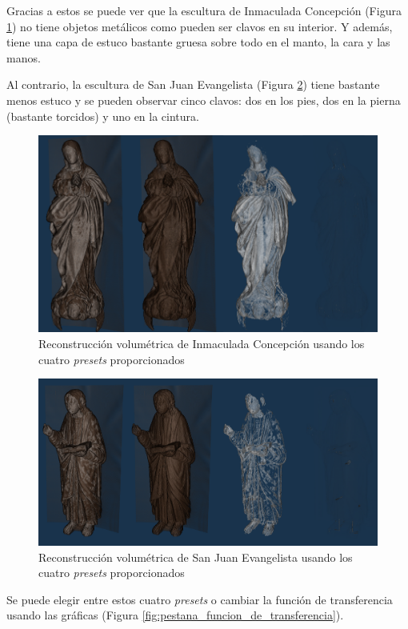 Gracias a estos se puede ver que la escultura de Inmaculada Concepción (Figura \ref{fig:inmaculada_concepcion}) no tiene objetos metálicos como pueden ser clavos en su interior. Y además, tiene una capa de estuco bastante gruesa sobre todo en el manto, la cara y las manos.

Al contrario, la escultura de San Juan Evangelista (Figura \ref{fig:san_juan_evangelista}) tiene bastante menos estuco y se pueden observar cinco clavos: dos en los pies, dos en la pierna (bastante torcidos) y uno en la cintura.

\begin{figure}[H]
	\centering
	\includegraphics[width=12cm]{imagenes/inmaculada_concepcion}
	\caption{Reconstrucción volumétrica de Inmaculada Concepción usando los cuatro \textit{presets} proporcionados}
	\label{fig:inmaculada_concepcion}
\end{figure}

\begin{figure}[H]
	\centering
	\includegraphics[width=12cm]{imagenes/san_juan_evangelista}
	\caption{Reconstrucción volumétrica de San Juan Evangelista usando los cuatro \textit{presets} proporcionados}
	\label{fig:san_juan_evangelista}
\end{figure}

Se puede elegir entre estos cuatro \textit{presets} o cambiar la función de transferencia usando las gráficas (Figura \ref{fig:pestana_funcion_de_transferencia}).


